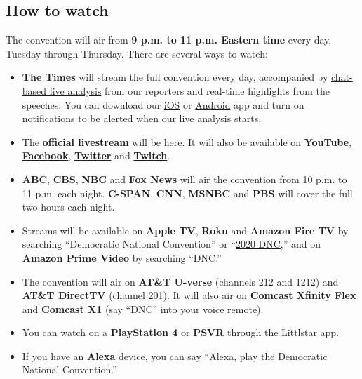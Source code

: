 \hypertarget{how-to-watch}{%
\subsection{How to watch}\label{how-to-watch}}

The convention will air from \textbf{9 p.m. to 11 p.m. Eastern time}
every day, Tuesday through Thursday. There are several ways to watch:

\begin{itemize}
\tightlist
\item
  \textbf{The Times} will stream the full convention every day,
  accompanied by
  \href{https://www.nytimes3xbfgragh.onion/interactive/2020/08/18/us/politics/live-dnc-stream-analysis.html}{chat-based
  live analysis} from our reporters and real-time highlights from the
  speeches. You can download our
  \href{https://slack-redir.net/link?url=https\%3A\%2F\%2Fsearch.itunes.apple.com\%2FWebObjects\%2FMZContentLink.woa\%2Fwa\%2Flink\%3Fmt\%3D8\%26path\%3Dapps\%252fnytimes}{iOS}
  or
  \href{https://slack-redir.net/link?url=https\%3A\%2F\%2Fhelp.nytimes3xbfgragh.onion\%2Fhc\%2Fen-us\%2Farticles\%2F115015970768-Android}{Android}
  app and turn on notifications to be alerted when our live analysis
  starts.
\end{itemize}

\begin{itemize}
\item
  The \textbf{official livestream}
  \href{https://www.demconvention.com/watch-the-convention/}{will be
  here}. It will also be available on
  \textbf{\href{http://www.YouTube.com/demconvention}{YouTube}},
  \textbf{\href{http://www.facebookcorewwwi.onion/demconvention}{Facebook}},
  \textbf{\href{http://www.twitter.com/demconvention}{Twitter}} and
  \textbf{\href{https://www.twitch.tv/demconvention}{Twitch}}.
\item
  \textbf{ABC}, \textbf{CBS}, \textbf{NBC} and \textbf{Fox News} will
  air the convention from 10 p.m. to 11 p.m. each night.
  \textbf{C-SPAN}, \textbf{CNN}, \textbf{MSNBC} and \textbf{PBS} will
  cover the full two hours each night.
\item
  Streams will be available on \textbf{Apple TV}, \textbf{Roku} and
  \textbf{Amazon Fire TV} by searching ``Democratic National
  Convention'' or
  ``\href{https://www.nytimes3xbfgragh.onion/article/the-dnc-explained.html}{2020
  DNC},'' and on \textbf{Amazon Prime Video} by searching ``DNC.''
\item
  The convention will air on \textbf{AT\&T U-verse} (channels 212 and
  1212) and \textbf{AT\&T DirectTV} (channel 201). It will also air on
  \textbf{Comcast Xfinity Flex} and \textbf{Comcast X1} (say ``DNC''
  into your voice remote).
\item
  You can watch on a \textbf{PlayStation 4} or \textbf{PSVR} through the
  Littlstar app.
\item
  If you have an \textbf{Alexa} device, you can say ``Alexa, play the
  Democratic National Convention.''
\end{itemize}

